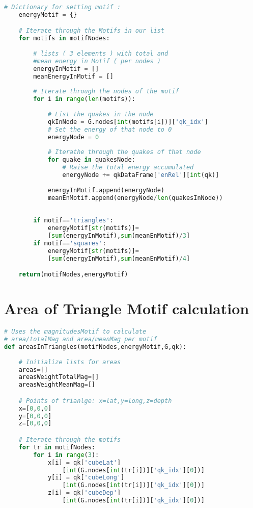 \documentclass[12pt, twoside]{report}
\begin{document}
\begin{appendices}
\begin{lstlisting}[language=python, frame=single, tabsize=1]
    # Dictionary for setting motif : 
    energyMotif = {}

    # Iterate through the Motifs in our list
    for motifs in motifNodes:
        
        # lists ( 3 elements ) with total and 
        #mean energy in Motif ( per nodes )
        energyInMotif = []
        meanEnergyInMotif = []
        
        # Iterate through the nodes of the motif
        for i in range(len(motifs)):
            
            # List the quakes in the node
            qkInNode = G.nodes[int(motifs[i])]['qk_idx']
            # Set the energy of that node to 0
            energyNode = 0
            
            # Iterathe through the quakes of that node
            for quake in quakesNode:
                # Raise the total energy accumulated
                energyNode += qkDataFrame['enRel'][int(qk)]
            
            energyInMotif.append(energyNode)
            meanEnMotif.append(energyNode/len(quakesInNode))
        
    
        if motif=='triangles':
            energyMotif[str(motifs)]=
            [sum(energyInMotif),sum(meanEnMotif)/3]
        if motif=='squares':
            energyMotif[str(motifs)]=
            [sum(energyInMotif),sum(meanEnMotif)/4]

    return(motifNodes,energyMotif)
\end{lstlisting}

\section{Area of Triangle Motif calculation}

\begin{lstlisting}[language=python, frame=single, tabsize=1] 
# Uses the magnitudesMotif to calculate
# area/totalMag and area/meanMag per motif
def areasInTriangles(motifNodes,energyMotif,G,qk):
    
    # Initialize lists for areas
    areas=[]
    areasWeightTotalMag=[]
    areasWeightMeanMag=[]

    # Points of trianlge: x=lat,y=long,z=depth 
    x=[0,0,0]
    y=[0,0,0]
    z=[0,0,0]

    # Iterate through the motifs 
    for tr in motifNodes:
        for i in range(3):
            x[i] = qk['cubeLat']
            	[int(G.nodes[int(tr[i])]['qk_idx'][0])]
            y[i] = qk['cubeLong']
            	[int(G.nodes[int(tr[i])]['qk_idx'][0])]
            z[i] = qk['cubeDep']
            	[int(G.nodes[int(tr[i])]['qk_idx'][0])]
        

\end{lstlisting}
\end{appendices}
\end{document}
